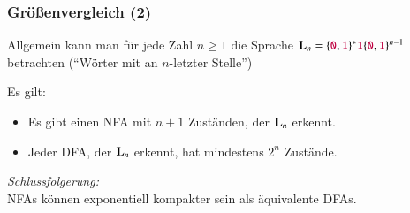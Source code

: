 \documentclass[aspectratio=1610,onlymath]{beamer}
\begin{document}
\begin{frame}\frametitle{Größenvergleich (2)}

Allgemein kann man für jede Zahl $n\geq 1$ die Sprache $\textbf{\textcolor{black}{L}}_n= \{\mathtt{\textcolor{purple}{0}},\mathtt{\textcolor{purple}{1}}\}^* \mathtt{\textcolor{purple}{1}} \{\mathtt{\textcolor{purple}{0}},\mathtt{\textcolor{purple}{1}}\}^{n-1} $ betrachten ("`Wörter mit  an $n$-letzter Stelle"')
\medskip

Es gilt:
\begin{itemize}
\item Es gibt einen NFA mit $n+1$ Zuständen, der $\textbf{\textcolor{black}{L}}_n$ erkennt.
\item Jeder DFA, der $\textbf{\textcolor{black}{L}}_n$ erkennt, hat mindestens $2^n$ Zustände.
\end{itemize}

\bigskip

\emph{Schlussfolgerung:}\\
\alert{NFAs können exponentiell kompakter sein als äquivalente DFAs.}

\end{frame}
\end{document}
